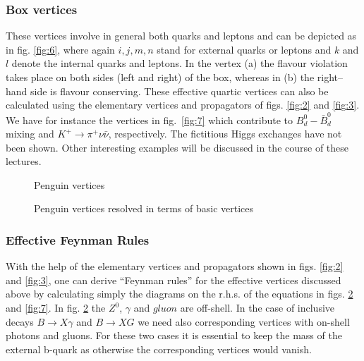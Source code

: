 \documentclass[12pt,rotate]{article}
\begin{document}
\begin{itemize}
\subsubsection{Box vertices}
These vertices involve in general both quarks and leptons and can be
depicted as in fig. \ref{fig:6},
where again $i,j,m,n$ stand for external quarks or leptons and $k$ and
$l$ denote the internal quarks and leptons. In the vertex (a) the
flavour violation takes place on both sides (left and right) of the
box, whereas in (b) the right--hand side is flavour conserving. These
effective quartic vertices can also be calculated using the elementary
vertices and propagators of figs. \ref{fig:2} and \ref{fig:3}. We have
for instance the vertices in fig.~\ref{fig:7}
which contribute to $B_d^0-\bar B_d^0$ mixing and $K^+\to\pi^+\nu\bar\nu$, 
respectively.
The fictitious Higgs exchanges have not been shown.
Other interesting examples will be discussed in the course of these
lectures. \par
\begin{figure}[hbt]
\centerline{
\epsfysize=1.6in
}
\vspace{0.08in}
\caption[]{
Penguin vertices
\label{fig:4}}
\end{figure}

\begin{figure}[htb]
\centerline{
\epsfysize=3.2in
}
\caption[]{
Penguin vertices resolved in terms of basic vertices
\label{fig:5}}
\end{figure}

\subsubsection{Effective Feynman Rules}
With the help of the elementary vertices and propagators 
shown in figs. \ref{fig:2} and \ref{fig:3}, 
one can  derive
``Feynman rules'' for the effective vertices discussed above by
calculating simply the diagrams on the r.h.s. of the equations in
figs. \ref{fig:5} and \ref{fig:7}. In fig. \ref{fig:5} 
the $Z^0$, $\gamma$ and $gluon$ are
off-shell. In the case of inclusive decays $B \to X\gamma$ and
$B \to X G$ we need also corresponding vertices with on-shell
photons and gluons. For these two cases it is essential to
keep the mass of the external b-quark as otherwise the corresponding 
vertices would vanish.  


\end{itemize}
\end{document}
